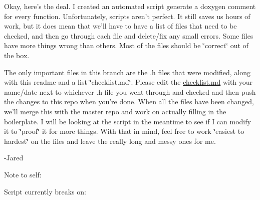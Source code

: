 Okay, here's the deal. I created an automated script generate a doxygen comment for every function. Unfortunately, scripts aren't perfect. It still saves us hours of work, but it does mean that we'll have to have a list of files that need to be checked, and then go through each file and delete/fix any small errors. Some files have more things wrong than others. Most of the files should be \char`\"{}correct\char`\"{} out of the box.

The only important files in this branch are the .h files that were modified, along with this readme and a list \char`\"{}checklist.\+md\char`\"{}. Please edit the \hyperlink{checklist_8md_source}{checklist.\+md} with your name/date next to whichever .h file you went through and checked and then push the changes to this repo when you're done. When all the files have been changed, we'll merge this with the master repo and work on actually filling in the boilerplate. I will be looking at the script in the meantime to see if I can modify it to \char`\"{}proof\char`\"{} it for more things. With that in mind, feel free to work \char`\"{}easiest to hardest\char`\"{} on the files and leave the really long and messy ones for me.

-\/\+Jared

Note to self\+:

Script currently breaks on\+:


